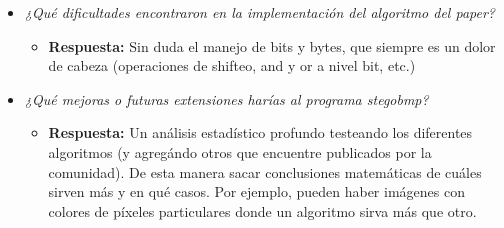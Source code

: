 \documentclass[a4paper,12pt]{article}
\begin{document}
\begin{itemize}
		\item \textit{¿Qué dificultades encontraron en la implementación del algoritmo del paper?}
		\begin{itemize}
			\item \textbf{Respuesta:} Sin duda el manejo de bits y bytes, que siempre es un dolor de cabeza (operaciones de shifteo, and y or a nivel bit, etc.)
		\end{itemize}
		
		\item \textit{¿Qué mejoras o futuras extensiones harías al programa stegobmp?}
		\begin{itemize}
			\item \textbf{Respuesta:} Un análisis estadístico profundo testeando los diferentes algoritmos (y agregándo otros que encuentre publicados por la comunidad). De esta manera sacar conclusiones matemáticas de cuáles sirven más y en qué casos. Por ejemplo, pueden haber imágenes con colores de píxeles particulares donde un algoritmo sirva más que otro.
		\end{itemize}
	\end{itemize}
	
\end{document}
